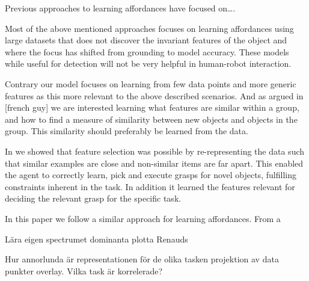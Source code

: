 Previous approaches to learning affordances have focused on\ldots{}.

Most of the above mentioned approaches focuses on learning affordances
using large datasets that does not discover the invariant features of
the object and where the focus has shifted from grounding to model
accuracy. These models while useful for detection will not be very
helpful in human-robot interaction.

Contrary our model focuses on learning from few data points and more
generic features as this more relevant to the above described scenarios.
And as argued in {[}french guy{]} we are interested learning what
features are similar within a group, and how to find a measure of
similarity between new objects and objects in the group. This similarity
should preferably be learned from the data.

In \cite{Hjelm:2015hw} we showed that feature selection was possible by
re-representing the data such that similar examples are close and
non-similar items are far apart. This enabled the agent to correctly
learn, pick and execute grasps for novel objects, fulfilling constraints
inherent in the task. In addition it learned the features relevant for
deciding the relevant grasp for the specific task.

In this paper we follow a similar approach for learning affordances.
From a

Lära eigen spectrumet dominanta plotta Renauds

Hur annorlunda är representationen för de olika tasken projektion av
data punkter overlay. Vilka task är korrelerade?
